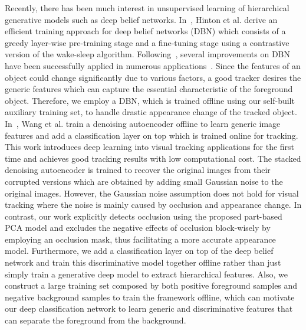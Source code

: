 \documentclass[preprint,12pt,review]{elsarticle}
\begin{document}
%
Recently, there has been much interest in unsupervised learning of hierarchical generative models such as deep belief networks.
%
In~\cite{hinton2006fast}, Hinton et al. derive an efficient training approach for deep belief networks (DBN) which consists of a greedy layer-wise pre-training stage and a fine-tuning stage using a contrastive version of the wake-sleep algorithm.
%
Following~\cite{hinton2006fast}, several improvements on DBN have been successfully applied in numerous applications~\cite{lee2009convolutional,lee2009unsupervised,lee2007sparse}.
%
Since the features of an object could change significantly due to various factors, a good tracker desires the generic features which can capture the essential characteristic of the foreground object.
%
Therefore, we employ a DBN, which is trained offline using our self-built auxiliary training set, to handle drastic appearance change of the tracked object.
%
In~\cite{wang2013learning}, Wang et al. train a denoising autoencoder offline to learn generic image features and add a classification layer on top which is trained online for tracking.
%
This work introduces deep learning into visual tracking applications for the first time and achieves good tracking results with low computational cost.
%
%
The stacked denoising autoencoder is trained to recover the original images from their corrupted versions which are obtained by adding small Gaussian noise to the original images.
%
However, the Gaussian noise assumption does not hold for visual tracking where the noise is mainly caused by occlusion and appearance change.
%
%
In contrast, our work explicitly detects occlusion using the proposed part-based PCA model and excludes the negative effects of occlusion block-wisely by employing an occlusion mask, thus facilitating a more accurate appearance model.
%
Furthermore, we add a classification layer on top of the deep belief network and train this discriminative model together offline rather than just simply train a generative deep model to extract hierarchical features.
%
Also, we construct a large training set composed by both positive foreground samples and negative background samples to train the framework offline, which can motivate our deep classification network to learn generic and discriminative features that can separate the foreground from the background.
%
\end{document}
